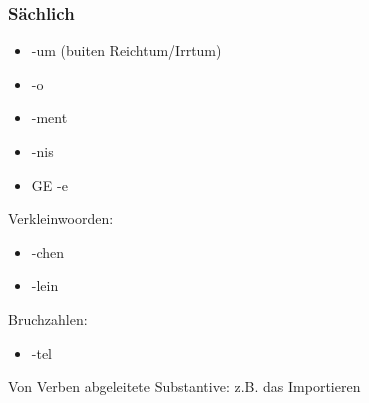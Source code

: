 \documentclass[main.tex]{subfiles}
\begin{document}
\begin{minipage}[t]{0,34\textwidth}
 \subsubsection{Sächlich}
 \begin{itemize}
 \item -um (buiten Reichtum/Irrtum)
 \item -o
 \item -ment
 \item -nis
 \item GE -e
 \end{itemize}
 Verkleinwoorden:
 \begin{itemize}
 \item -chen
 \item -lein
 \end{itemize}
 Bruchzahlen:
 \begin{itemize}
 \item -tel
 \end{itemize}
 Von Verben abgeleitete Substantive:
 z.B. das Importieren
\end{minipage}
\end{document}
